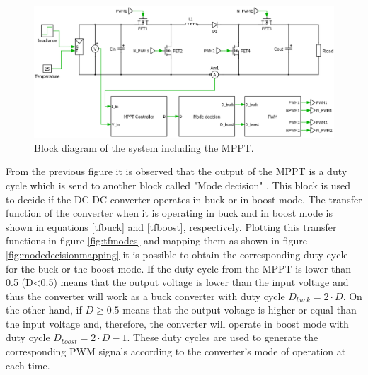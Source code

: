 \begin{figure}[H]
	\begin{center}
		\includegraphics[width=\textwidth]{../Pictures/BD_implementation_POalgorithm}
		\caption{Block diagram of the system including the MPPT.}
		\label{BD_POalgorithm}
	\end{center}	
\end{figure}
From the previous figure it is observed that the output of the MPPT is a duty cycle which is send to another block called "Mode decision" . This block is used to decide if the DC-DC converter operates in buck or in boost mode. The transfer function of the converter when it is operating in buck and in boost mode is shown in equations \ref{tfbuck} and \ref{tfboost}, respectively. Plotting this transfer functions in figure \ref{fig:tfmodes} and mapping them as shown in figure \ref{fig:modedecisionmapping} it is possible to obtain the corresponding duty cycle for the buck or the boost mode. If the duty cycle from the MPPT  is lower than 0.5 (D<0.5) means that the output voltage is lower than the input voltage and thus the converter will work as a buck converter with duty cycle $D_{buck}=2\cdot D$. On the other hand, if $D \geq 0.5$ means that the output voltage is higher or equal than the input voltage and, therefore, the converter will operate in boost mode with duty cycle $D_{boost}=2\cdot D - 1$. These duty cycles are used to generate the corresponding PWM signals according to the converter's mode of operation at each time. 

